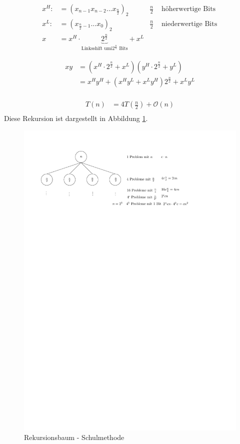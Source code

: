 \begin{align*}
    x^H:&=(x_{n-1}x_{n-2}...x_{\frac{n}{2}})_2& \frac{n}{2}& \text{ höherwertige Bits }\\
    x^L:&=(x_{\frac{n}{2}-1}...x_0)_2 &\frac{n}{2}&\text{ niederwertige Bits}\\
    x &= x^H\cdot \underbrace{2^\frac{n}{2}}_{\text{Linksshift umi} 2^\frac{n}{2} \text{ Bits}}+x^L
\end{align*}


\begin{align*}
    xy&= (x^H\cdot 2^{\frac{n}{2}}+x^L)(y^H\cdot 2^{\frac{n}{2}}+y^L)\\
      &=x^Hy^H+(x^Hy^L+x^Ly^H)2^{\frac{n}{2}}+x^Ly^L\\
\end{align*}

\begin{align*}
    T(n)&=4T(\frac{n}{2})+\mathcal{O}(n)\\
\end{align*}
Diese Rekursion ist dargestellt in Abbildung \ref{fig:rekursion-schul}.\\
\begin{figure}[h!]
    \begin{center}
        \includegraphics[width=\textwidth]{../GFX/vl4_fig_4.pdf}
        \caption{Rekursionsbaum - Schulmethode}
        \label{fig:rekursion-schul}
    \end{center}
\end{figure}

